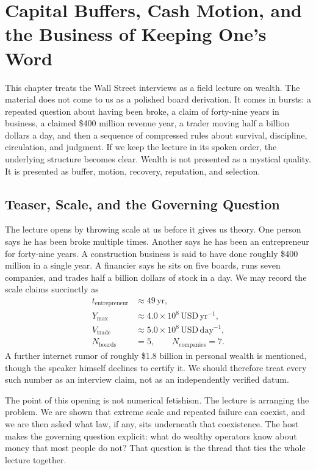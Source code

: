 \chapter{Capital Buffers, Cash Motion, and the Business of Keeping One's Word}

This chapter treats the Wall Street interviews as a field lecture on wealth. The material does not come to us as a polished board derivation. It comes in bursts: a repeated question about having been broke, a claim of forty-nine years in business, a claimed \$400 million revenue year, a trader moving half a billion dollars a day, and then a sequence of compressed rules about survival, discipline, circulation, and judgment. If we keep the lecture in its spoken order, the underlying structure becomes clear. Wealth is not presented as a mystical quality. It is presented as buffer, motion, recovery, reputation, and selection.

\section{Teaser, Scale, and the Governing Question}

The lecture opens by throwing scale at us before it gives us theory. One person says he has been broke multiple times. Another says he has been an entrepreneur for forty-nine years. A construction business is said to have done roughly \$400 million in a single year. A financier says he sits on five boards, runs seven companies, and trades half a billion dollars of stock in a day. We may record the scale claims succinctly as
\begin{align}
t_{\text{entrepreneur}} &\approx 49\,\text{yr},\\
Y_{\max} &\approx 4.0\times 10^8\,\text{USD}\,\text{yr}^{-1},\\
V_{\text{trade}} &\approx 5.0\times 10^8\,\text{USD}\,\text{day}^{-1},\\
N_{\text{boards}} &= 5,\qquad N_{\text{companies}} = 7.
\end{align}
A further internet rumor of roughly \$1.8 billion in personal wealth is mentioned, though the speaker himself declines to certify it. We should therefore treat every such number as an interview claim, not as an independently verified datum.

The point of this opening is not numerical fetishism. The lecture is arranging the problem. We are shown that extreme scale and repeated failure can coexist, and we are then asked what law, if any, sits underneath that coexistence. The host makes the governing question explicit: what do wealthy operators know about money that most people do not? That question is the thread that ties the whole lecture together.

